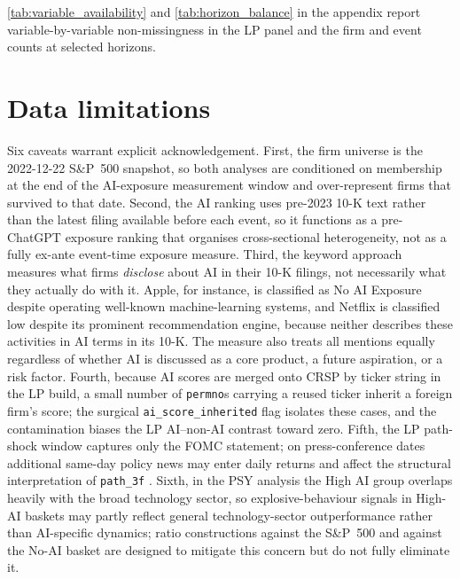 \cref{tab:variable_availability} and \cref{tab:horizon_balance} in the appendix report variable-by-variable non-missingness in the LP panel and the firm and event counts at selected horizons.

\section{Data limitations}
\label{sec:data-limitations}

Six caveats warrant explicit acknowledgement. First, the firm universe is the 2022-12-22 S\&P~500 snapshot, so both analyses are conditioned on membership at the end of the AI-exposure measurement window and over-represent firms that survived to that date. Second, the AI ranking uses pre-2023 10-K text rather than the latest filing available before each event, so it functions as a pre-ChatGPT exposure ranking that organises cross-sectional heterogeneity, not as a fully ex-ante event-time exposure measure. Third, the keyword approach measures what firms \emph{disclose} about AI in their 10-K filings, not necessarily what they actually do with it. Apple, for instance, is classified as No AI Exposure despite operating well-known machine-learning systems, and Netflix is classified low despite its prominent recommendation engine, because neither describes these activities in AI terms in its 10-K. The measure also treats all mentions equally regardless of whether AI is discussed as a core product, a future aspiration, or a risk factor. Fourth, because AI scores are merged onto CRSP by ticker string in the LP build, a small number of \texttt{permno}s carrying a reused ticker inherit a foreign firm's score; the surgical \texttt{ai\_score\_inherited} flag isolates these cases, and the contamination biases the LP AI--non-AI contrast toward zero. Fifth, the LP path-shock window captures only the FOMC statement; on press-conference dates additional same-day policy news may enter daily returns and affect the structural interpretation of \texttt{path\_3f} \citep{jarocinskiKaradi2020, mirandaAgrippinoRicco2021, gurkaynakKarasoyCanLee2022, durante2022}. Sixth, in the PSY analysis the High AI group overlaps heavily with the broad technology sector, so explosive-behaviour signals in High-AI baskets may partly reflect general technology-sector outperformance rather than AI-specific dynamics; ratio constructions against the S\&P~500 and against the No-AI basket are designed to mitigate this concern but do not fully eliminate it.